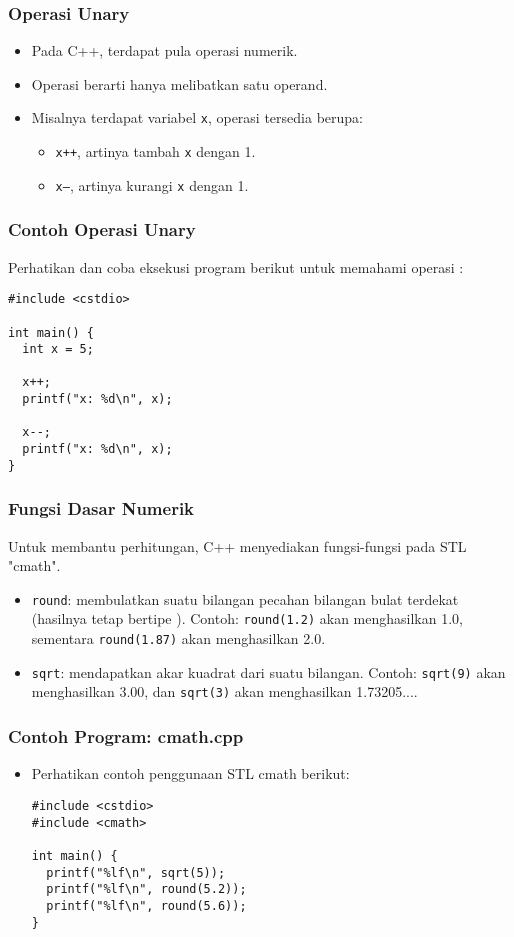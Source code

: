 \begin{frame}
\frametitle{Operasi Unary}
\begin{itemize}
  \item Pada C++, terdapat pula operasi  numerik.
  \item Operasi  berarti hanya melibatkan satu operand.
  \item Misalnya terdapat variabel \texttt{x}, operasi  tersedia berupa:
  \begin{itemize}
    \item \texttt{x++}, artinya tambah \texttt{x} dengan 1.
    \item \texttt{x--}, artinya kurangi \texttt{x} dengan 1.
  \end{itemize}
\end{itemize}
\end{frame}

\begin{frame}[fragile]
\frametitle{Contoh Operasi Unary}
Perhatikan dan coba eksekusi program berikut untuk memahami operasi :
\begin{lstlisting}
#include <cstdio>

int main() {
  int x = 5;

  x++;
  printf("x: %d\n", x);

  x--;
  printf("x: %d\n", x);
}
\end{lstlisting}
\end{frame}

\begin{frame}
\frametitle{Fungsi Dasar Numerik}
Untuk membantu perhitungan, C++ menyediakan fungsi-fungsi pada STL "cmath".
\begin{itemize}
  \item \texttt{round}: membulatkan suatu bilangan pecahan bilangan bulat terdekat (hasilnya tetap bertipe ). Contoh: \texttt{round(1.2)} akan menghasilkan 1.0, sementara \texttt{round(1.87)} akan menghasilkan 2.0.
  \item \texttt{sqrt}: mendapatkan akar kuadrat dari suatu bilangan. Contoh: \texttt{sqrt(9)} akan menghasilkan 3.00, dan \texttt{sqrt(3)} akan menghasilkan 1.73205....
\end{itemize}
\end{frame}

\begin{frame}[fragile]
\frametitle{Contoh Program: cmath.cpp}
\begin{itemize}
  \item Perhatikan contoh penggunaan STL cmath berikut:
\begin{lstlisting}
#include <cstdio>
#include <cmath>

int main() {
  printf("%lf\n", sqrt(5));
  printf("%lf\n", round(5.2));
  printf("%lf\n", round(5.6));
}
\end{lstlisting}
\end{itemize}
\end{frame}

